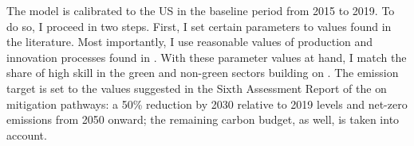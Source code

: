 
The model is calibrated to the US in the baseline period from 2015 to 2019. To do so, I proceed in two steps. First, I set certain parameters to values found in the literature. Most importantly, I use reasonable values of production and innovation processes found in \cite{Fried2018ClimateAnalysis}. %
With these parameter values at hand, I match the share of high skill in the green and non-green sectors building on \cite{Consoli2016DoCapital}. The emission target is set to the values suggested in the Sixth Assessment Report of the \cite{IPCC2022} on mitigation pathways: a 50\% reduction by 2030 relative to 2019 levels and  net-zero emissions from 2050 onward; the remaining carbon budget, as well, is taken into account.

